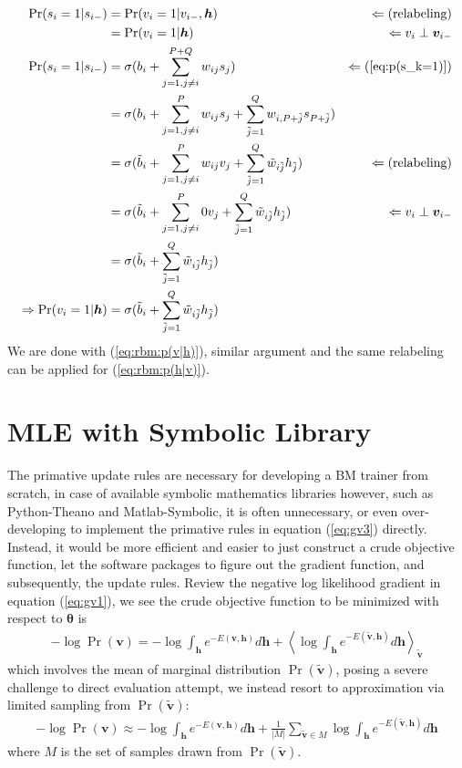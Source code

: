 \documentclass[11pt]{article}
\newcommand{\mean}[2]{\left\langle{#1}\right\rangle_{#2}}
\newcommand{\vh}{\boldsymbol{h}}
\newcommand{\vv}{\boldsymbol{v}}
\newcommand{\vvt}{\tilde{\vv}}
\newcommand{\pEC}{\boldsymbol{\theta}}
\begin{document}
{\begin{align*}
  \Pr(s_i=1|s_{i-}) & = \Pr(v_i=1|v_{i-}, \vh)                                  & \Leftarrow (\textrm{relabeling}) \\
                    & = \Pr(v_i=1|\vh)                                          & \Leftarrow v_i \perp \vv_{i-}    \\
  \Pr(s_i=1|s_{i-}) & = \sigma(b_i + \sum_{j=1, j \ne i}^{P+Q}{w_{ij}s_j} )     & \Leftarrow (\ref{eq:p(s_k=1)})   \\
                    & = \sigma(b_i + \sum_{j=1, j \ne i}^P{w_{ij}s_j}
                      + \sum_{\jt=1}^{Q}{w_{i,P+\jt}s_{P+\jt}}) \\
                    & = \sigma(\bt_i + \sum_{j=1, j \ne i}^P{w_{ij}v_j}
                      + \sum_{\jt=1}^{Q}{\wt_{i\jt}h_{\jt}})                    & \Leftarrow (\textrm{relabeling}) \\
                    & = \sigma(\bt_i + \sum_{j=1, j \ne i}^P{0 v_j}
                      + \sum_{\jt=1}^{Q}{\wt_{i\jt}h_{\jt}})                    & \Leftarrow v_i \perp \vv_{i-} \\
                    & = \sigma(\bt_i + \sum_{\jt=1}^Q{\wt_{i\jt}h_{\jt}}) \\
  \Rightarrow \Pr(v_i=1|\vh) & = \sigma(\bt_i + \sum_{\jt=1}^Q{\wt_{i\jt}h_{\jt}})
\end{align*}
We are done with (\ref{eq:rbm:p(v|h)}), similar argument and the same relabeling can be applied for (\ref{eq:rbm:p(h|v)}).
% 
\section{MLE with Symbolic Library}
The primative update rules are necessary for developing a BM trainer from scratch, in case of available symbolic mathematics libraries however, such as Python-Theano and Matlab-Symbolic, it is often unnecessary, or even over-developing to implement the primative rules in equation (\ref{eq:gv3}) directly. Instead, it would be more efficient and easier to just construct a crude objective function, let the software packages to figure out the gradient function, and subsequently, the update rules.
Review the negative log likelihood gradient in equation (\ref{eq:gv1}), we see the crude objective function to be minimized with respect to $\pEC$ is
\begin{align}\label{eq:l(v)1}
  -\log{\Pr(\vv)} = -\log{\int_{\vh}{e^{-E(\vv, \vh)}d\vh}} + \mean{\log{\int_{\vh}{e^{-E(\vvt, \vh)}d\vh}}}{\vvt}
\end{align}
which involves the mean of marginal distribution $\Pr(\vvt)$, posing a severe challenge to direct evaluation attempt, we instead resort to approximation via limited sampling from $\Pr(\vvt)$:
\begin{align}\label{eq:l(v)2}
  -\log{\Pr(\vv)} \approx -\log{\int_{\vh} e^{-E(\vv, \vh)} d\vh} + \frac{1}{|M|}\sum_{\vvt \in M}{\log{\int_{\vh} e^{-E(\vvt, \vh)}d\vh}}
\end{align}
where $M$ is the set of samples drawn from $\Pr(\vvt)$. \\
}
\end{document}

